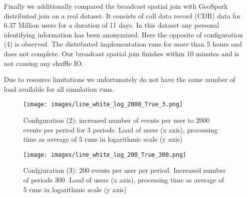 \documentclass[conference]{IEEEtran}
\begin{document}
Finally we additionally compared the broadcast spatial join with GeoSpark distributed join on a real dataset.
It consists of call data record (CDR) data for 6.37 Million users for a duration of 11 days.
In this dataset any personal identifying information has been anonymized.
Here the opposite of configuration (4) is observed. The distributed implementation runs for more than 5 hours and does not complete.
Our broadcast spatial join finishes within 10 minutes and is not causing any shuffle IO.

Due to resource limitations we unfortunately do not have the same number of load available for all simulation runs.
\begin{figure}%
\centerline{\texttt{[image: images/line\_white\_log\_2000\_True\_3.png]}}
\caption{Configuration (2): increased number of events per user to 2000 events per period for 3 periods. Load of users (x axis), processing time as average of 5 runs in logarithmic scale (y axis)}
\label{fig:more_events}
\end{figure}
\begin{figure}%
\centerline{\texttt{[image: images/line\_white\_log\_200\_True\_300.png]}}
\caption{Confgiuration (3): 200 events per user per period. Increased number of periods 300. Load of users (x axis), processing time as average of 5 runs in logarithmic scale (y axis)}
\label{fig:more_periods}
\end{figure}
\end{document}

